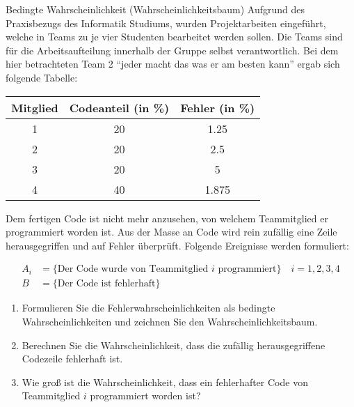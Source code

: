 \begin{example}{Bedingte Wahrscheinlichkeit (Wahrscheinlichkeitsbaum)}
    Aufgrund des Praxisbezugs des Informatik Studiums, wurden Projektarbeiten eingeführt, welche in Teams zu je vier Studenten bearbeitet werden sollen.
    Die Teams sind für die Arbeitsaufteilung innerhalb der Gruppe selbst verantwortlich.
    Bei dem hier betrachteten Team 2 \enquote{jeder macht das was er am besten kann} ergab sich folgende Tabelle:

    \begin{center}
        \begin{tabular}{|c|c|c|}
            \hline
            Mitglied & Codeanteil (in \%) & Fehler (in \%) \\
            \hline
            1        & 20                 & 1.25           \\
            2        & 20                 & 2.5            \\
            3        & 20                 & 5              \\
            4        & 40                 & 1.875          \\
            \hline
        \end{tabular}
    \end{center}

    Dem fertigen Code ist nicht mehr anzusehen, von welchem Teammitglied er programmiert worden ist.
    Aus der Masse an Code wird rein zufällig eine Zeile herausgegriffen und auf Fehler überprüft.
    Folgende Ereignisse werden formuliert:

    \[
        \begin{aligned}
            A_i & = \{ \text{Der Code wurde von Teammitglied $i$ programmiert} \} \quad i = 1,2,3,4 \\
            B   & = \{ \text{Der Code ist fehlerhaft} \}
        \end{aligned}
    \]

    \begin{enumerate}[\alph*)]
        \item Formulieren Sie die Fehlerwahrscheinlichkeiten als bedingte Wahrscheinlichkeiten und zeichnen Sie den Wahrscheinlichkeitsbaum.
        \item Berechnen Sie die Wahrscheinlichkeit, dass die zufällig herausgegriffene Codezeile fehlerhaft ist.
        \item Wie groß ist die Wahrscheinlichkeit, dass ein fehlerhafter Code von Teammitglied $i$ programmiert worden ist?
    \end{enumerate}


\end{example}
